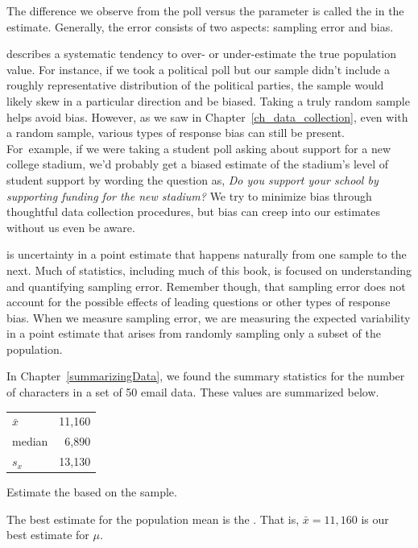 The difference we observe from the poll versus
the parameter is called the  in the estimate.  Generally, the error consists of two aspects:
sampling error and bias.

 describes a systematic tendency
to over- or under-estimate the true population value.
 For instance, if we took a political poll but our sample
  didn't include a roughly representative distribution of
  the political parties, the sample would likely skew
  in a particular direction and be biased.  Taking a truly random sample helps avoid bias.  However, as we saw in Chapter~\ref{ch_data_collection}, even with a random sample, various types of response bias can still be present.  For~example, if we were taking a student poll asking
about support for a new college stadium, we'd probably
get a biased estimate of the stadium's level of student
support by wording the question as,
\emph{Do you support your school by supporting funding
  for the new stadium?}
We try to minimize bias through thoughtful data
collection procedures, but bias can creep into our estimates without us even be aware.

   is uncertainty in a point estimate that happens naturally from one sample to the next. Much of statistics, including much of this book, is focused on understanding and quantifying sampling error.  Remember though, that sampling error does not account for the possible effects of leading questions or other types of response bias.  When we measure sampling error, we are measuring the expected variability in a point estimate that arises from randomly sampling only a subset of the population.


\begin{examplewrap}
\begin{nexample}{
In Chapter~\ref{summarizingData}, we found the summary statistics for the number of characters in a set of 50 email data. These values are summarized below.

\begin{tabular}{l r }
$\bar{x}$ & 11,160 \\
median & 6,890 \\
$s_x$ & 13,130
\end{tabular}

Estimate the  based on the sample.}The best estimate for the population mean is the . That is,
$\bar{x} = 11,160$ is our best estimate for $\mu$.
\end{nexample}
\end{examplewrap}

